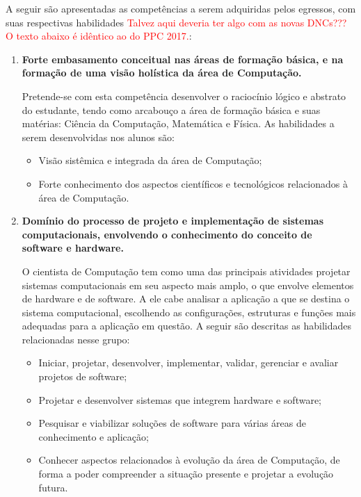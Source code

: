 A seguir são apresentadas as competências a serem adquiridas pelos egressos,
com suas respectivas habilidades \textcolor{red}{Talvez aqui deveria ter algo com as novas DNCs??? O texto abaixo é idêntico ao do PPC 2017.}:
\begin{enumerate}
    \item \textbf{Forte embasamento conceitual nas áreas de formação básica, e
    na formação de uma visão holística da área de Computação.}

    Pretende-se com esta competência desenvolver o raciocínio lógico e abstrato
    do estudante, tendo como arcabouço a área de formação básica e suas
    matérias: Ciência da Computação, Matemática e Física.
    As habilidades a serem desenvolvidas nos alunos são:
    \begin{itemize}
        \item Visão sistêmica e integrada da área de Computação;
        \item Forte conhecimento dos aspectos científicos e tecnológicos
        relacionados à área de Computação.
    \end{itemize}

    \item \textbf{Domínio do processo de projeto e implementação de sistemas
    computacionais, envolvendo o conhecimento do conceito de software e
    hardware.}

    O cientista de Computação tem como uma das principais atividades projetar
    sistemas computacionais em seu aspecto mais amplo, o que envolve elementos
    de hardware e de software. A ele cabe analisar a aplicação a que se destina
    o sistema computacional, escolhendo as configurações, estruturas e funções
    mais adequadas para a aplicação em questão.
    A seguir são descritas as habilidades relacionadas nesse grupo:
    \begin{itemize}
        \item Iniciar, projetar, desenvolver, implementar, validar, gerenciar e
        avaliar projetos de software;
        \item Projetar e desenvolver sistemas que integrem hardware e software;
        \item Pesquisar e viabilizar soluções de software para várias áreas de
        conhecimento e aplicação;
        \item Conhecer aspectos relacionados à evolução da área de Computação,
        de forma a poder compreender a situação presente e projetar a evolução
        futura.
    \end{itemize}


\end{enumerate}
